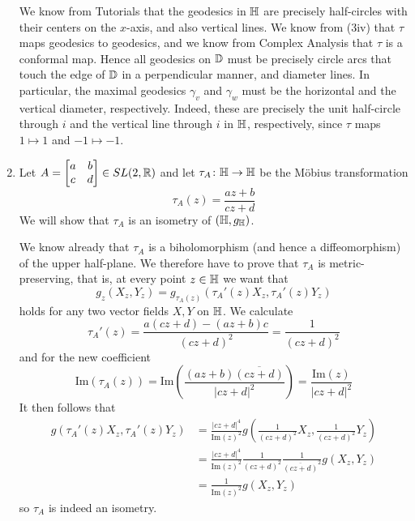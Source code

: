 \documentclass[a4paper, 12pt]{article}
\begin{document}
\begin{Exercise}
\begin{enumerate}[label=(\roman*)]
            We know from Tutorials that the geodesics in $\mathbb{H}$ are precisely
            half-circles with their centers on the $x$-axis, and also vertical lines.
            We know from (3iv) that $\tau$ maps geodesics to geodesics,
            and we know from Complex Analysis that $\tau$ is a conformal map.
            Hence all geodesics on $\mathbb{D}$ must be precisely circle arcs that touch the
            edge of $\mathbb{D}$ in a perpendicular manner, and diameter lines.
            In particular, the maximal geodesics $\gamma_v$ and $\gamma_w$ must be
            the horizontal and the vertical diameter, respectively.
            Indeed, these are precisely the unit half-circle through $i$ and the
            vertical line through $i$ in $\mathbb{H}$, respectively,
            since $\tau$ maps $1 \mapsto 1$ and $-1 \mapsto -1$.
        \item Let $A = \begin{bmatrix} a & b \\ c & d \end{bmatrix} \in SL(2, \mathbb{R})$ and
            let $\tau_A \colon \mathbb{H} \to \mathbb{H}$ be the M\"obius transformation
            \[
                \tau_A(z) = \frac{a z + b}{c z + d}
            \]
            We will show that $\tau_A$ is an isometry of $(\mathbb{H}, g_{\mathbb{H}})$.

            We know already that $\tau_A$ is a biholomorphism (and hence a diffeomorphism) of the upper half-plane.
            We therefore have to prove that $\tau_A$ is metric-preserving,
            that is, at every point $z \in \mathbb{H}$ we want that
            \[
                g_z(X_z, Y_z) = g_{\tau_A(z)}(\tau_A'(z)X_z, \tau_A'(z)Y_z)
            \]
            holds for any two vector fields $X, Y$ on $\mathbb{H}$.
            We calculate
            \[
                \tau_A'(z)
                = \frac{a(cz + d) - (az + b)c}{(cz + d)^2}
                = \frac{1}{(cz + d)^2}
            \]
            and for the new coefficient
            \[
                \text{Im}(\tau_A(z))
                = \text{Im}\left( \frac{(az + b)\overline{(cz + d)}}{|cz + d|^2} \right)
                = \frac{\text{Im}(z)}{|cz + d|^2}
            \]
            It then follows that
            \begin{align*}
                g(\tau_A '(z) X_z, \tau_A '(z) Y_z)
                &= \frac{|cz+d|^4}{\text{Im}(z)^2} g(\frac{1}{(cz+d)^2}X_z, \frac{1}{(cz+d)^2}Y_z) \\
                &= \frac{|cz+d|^4}{\text{Im}(z)^2} \frac{1}{(cz+d)^2} \frac{1}{\overline{(cz+d)}^2} g(X_z, Y_z) \\
                &= \frac{1}{\text{Im}(z)^2} g(X_z, Y_z)
            \end{align*}
            so $\tau_A$ is indeed an isometry.
    \end{enumerate}
\end{Exercise}
\end{document}
